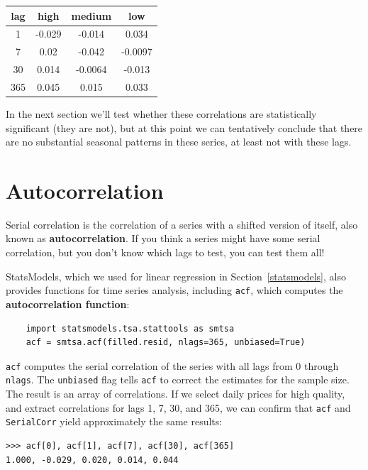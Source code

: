 \documentclass[12pt]{book}
\begin{document}
\begin{center}
\begin{tabular}{|c|c|c|c|}
\hline
lag & high & medium & low \\ \hline
1 & -0.029 & -0.014 & 0.034 \\
7 & 0.02 & -0.042 & -0.0097 \\
30 & 0.014 & -0.0064 & -0.013 \\
365 & 0.045 & 0.015 & 0.033 \\
\hline
\end{tabular}
\end{center}

In the next section we'll test whether these correlations are
statistically significant (they are not), but at this point we can
tentatively conclude that there are no substantial seasonal patterns
in these series, at least not with these lags.


\section{Autocorrelation}

Serial correlation is the correlation of a series with a shifted
version of itself, also known as {\bf autocorrelation}.  If you think
a series might have some serial correlation, but you don't know which
lags to test, you can test them all!

StatsModels, which we used for linear regression in
Section~\ref{statsmodels}, also provides functions for time series
analysis, including {\tt acf}, which computes the {\bf autocorrelation
  function}:

\begin{verbatim}
    import statsmodels.tsa.stattools as smtsa
    acf = smtsa.acf(filled.resid, nlags=365, unbiased=True)
\end{verbatim}

{\tt acf} computes the serial correlation of the series with all
lags from 0 through {\tt nlags}.  The {\tt unbiased} flag tells
{\tt acf} to correct the estimates for the sample size.  The result
is an array of correlations.  If we select daily prices for high
quality, and extract correlations for lags 1, 7, 30, and 365, we can
confirm that {\tt acf} and {\tt SerialCorr} yield approximately
the same results:

\begin{verbatim}
>>> acf[0], acf[1], acf[7], acf[30], acf[365]
1.000, -0.029, 0.020, 0.014, 0.044
\end{verbatim}
\end{document}
